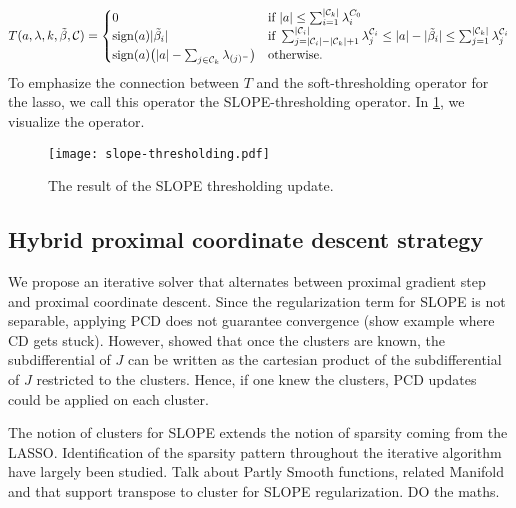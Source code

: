 \begin{equation}
  \label{eq:slope-thresholding}
  T(a, \lambda,k,\tilde \beta, \mathcal{C}) =
  \begin{cases}
    0                                                                 & \text{if } |a| \leq \sum_{i=1}^{|\mathcal{C}_k|}\lambda^{C_0}_i                                                                                                                               \\
    \operatorname{sign}(a)|\tilde \beta_i|                                          & \text{if } \sum_{j= |\mathcal{C}_i| - |\mathcal{C}_k| + 1}^{|\mathcal{C}_i|} \lambda^{\mathcal{C}_i}_j \leq |a| - |\tilde \beta_i| \leq \sum_{j=1}^{|\mathcal{C}_k|}\lambda^{\mathcal{C}_i}_j \\
    \operatorname{sign}(a)\big(|a| - \sum_{j \in \mathcal{C}_k}\lambda_{(j)^-}\big) & \text{otherwise.
    }
  \end{cases}
\end{equation}
To emphasize the connection between \(T\) and the soft-thresholding operator
for the lasso, we call this operator the SLOPE-thresholding operator.
In \cref{fig:slope-thresholding}, we visualize the operator.

\begin{figure}[htbp]
  \centering
  \texttt{[image: slope-thresholding.pdf]}
  \caption{The result of the SLOPE thresholding update.}
  \label{fig:slope-thresholding}
\end{figure}

\subsection{Hybrid proximal coordinate descent strategy}

We propose an iterative solver that alternates between proximal gradient step and proximal coordinate descent.
Since the regularization term for SLOPE is not separable, applying PCD does not guarantee convergence (show example where CD gets stuck).
However, \cite{dupuis2021} showed that once the clusters are known, the subdifferential of $J$ can be written as the cartesian product of the subdifferential of $J$ restricted to the clusters.
Hence, if one knew the clusters, PCD updates could be applied on each cluster.

The notion of clusters for SLOPE extends the notion of sparsity coming from the LASSO.
Identification of the sparsity pattern throughout the iterative algorithm have largely been studied.
Talk about Partly Smooth functions, related Manifold and that support transpose to cluster for SLOPE regularization. DO the maths.

